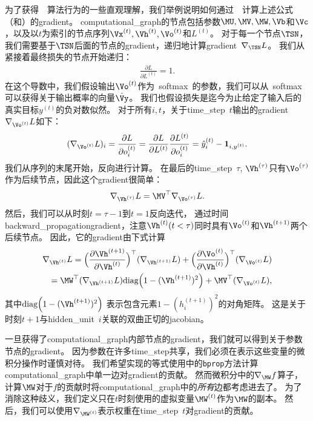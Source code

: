 为了获得~~算法行为的一些直观理解，我们举例说明如何通过~~计算上述公式（和）的\gls{gradient}。
\gls{computational_graph}的节点包括参数$\MU,\MV,\MW, \Vb$和$\Vc$，以及以$t$为索引的节点序列$\Vx^{(t)}, \Vh^{(t)},\Vo^{(t)}$和$L^{(t)}$。
对于每一个节点$\TSN$，我们需要基于$\TSN$后面的节点的\gls{gradient}，递归地计算\gls{gradient}~$\nabla_{\TSN} L$。
我们从紧接着最终损失的节点开始递归：
\begin{align}
 \frac{\partial L}{\partial L^{(t)}} = 1.
\end{align}
在这个导数中，我们假设输出$\Vo^{(t)}$作为~\gls{softmax}~的参数，我们可以从~\gls{softmax}可以获得关于输出概率的向量$\hat{\Vy}$。
我们也假设损失是迄今为止给定了输入后的真实目标$y^{(t)}$的负对数似然。
对于所有$i,t$，关于\gls{time_step}~$t$输出的\gls{gradient}~$\nabla_{\Vo^{(t)}} L$如下：
\begin{align}
 (\nabla_{\Vo^{(t)}} L)_i =  \frac{\partial L}{\partial o_i^{(t)}} 
 =  \frac{\partial L}{\partial L^{(t)}}  \frac{\partial L^{(t)}}{\partial o_i^{(t)}}  
 = \hat y_i^{(t)} - \mathbf{1}_{i,y^{(t)}}.
\end{align}
我们从序列的末尾开始，反向进行计算。
在最后的\gls{time_step}~$\tau$, $\Vh^{(\tau)}$只有$\Vo^{(\tau)}$作为后续节点，因此这个\gls{gradient}很简单：
\begin{align}
 \nabla_{\Vh^{(\tau)}} L = \MV^\top \nabla_{\Vo^{(\tau)}} L.
\end{align}
然后，我们可以从时刻$t=\tau-1$到$t=1$反向迭代， 通过时间\gls{backward_propagation}\gls{gradient}，注意$\Vh^{(t)}(t < \tau)$同时具有$\Vo^{(t)}$和$\Vh^{(t+1)}$两个后续节点。
因此，它的\gls{gradient}由下式计算
\begin{align}
  \nabla_{\Vh^{(t)}} L = \Big( \frac{\partial \Vh^{(t+1)}}{ \partial \Vh^{(t)}}  \Big)^\top(\nabla_{\Vh^{(t+1)}} L) 
  + \Big( \frac{\partial \Vo^{(t)}}{ \partial \Vh^{(t)}}  \Big)^\top (\nabla_{\Vo^{(t)}} L) \\
  = \MW^\top (\nabla_{\Vh^{(t+1)}} L) \text{diag} \Big( 1 - (\Vh^{(t+1)})^2 \Big) 
    + \MV^\top ( \nabla_{\Vo^{(t)}} L ),
\end{align}
其中$\text{diag} \Big( 1 - (\Vh^{(t+1)})^2 \Big) $ 表示包含元素$1 - (h_i^{(t+1)})^2$的对角矩阵。
这是关于时刻$t+1$与\gls{hidden_unit}~$i$关联的双曲正切的\gls{jacobian}。


一旦获得了\gls{computational_graph}内部节点的\gls{gradient}，我们就可以得到关于参数节点的\gls{gradient}。
因为参数在许多\gls{time_step}共享，我们必须在表示这些变量的微积分操作时谨慎对待。
我们希望实现的等式使用中的{\tt bprop}方法计算\gls{computational_graph}中单一边对\gls{gradient}的贡献。
然而微积分中的$\nabla_{\MW} f$算子，计算$\MW$对于$f$的贡献时将\gls{computational_graph}中的\emph{所有}边都考虑进去了。
为了消除这种歧义，我们定义只在$t$时刻使用的虚拟变量$\MW^{(t)}$作为$\MW$的副本。
然后，我们可以使用$\nabla_{\MW^{(t)}}$表示权重在\gls{time_step}~$t$对\gls{gradient}的贡献。

